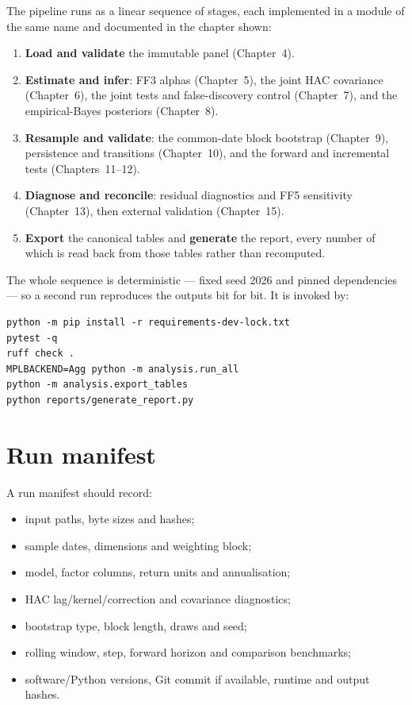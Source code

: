 The pipeline runs as a linear sequence of stages, each implemented in a
module of the same name and documented in the chapter shown:
\begin{enumerate}
\tightlist
\item
  \textbf{Load and validate} the immutable panel (Chapter~4).
\item
  \textbf{Estimate and infer}: FF3 alphas (Chapter~5), the joint HAC
  covariance (Chapter~6), the joint tests and false-discovery control
  (Chapter~7), and the empirical-Bayes posteriors (Chapter~8).
\item
  \textbf{Resample and validate}: the common-date block bootstrap
  (Chapter~9), persistence and transitions (Chapter~10), and the forward
  and incremental tests (Chapters~11--12).
\item
  \textbf{Diagnose and reconcile}: residual diagnostics and FF5 sensitivity
  (Chapter~13), then external validation (Chapter~15).
\item
  \textbf{Export} the canonical tables and \textbf{generate} the report,
  every number of which is read back from those tables rather than
  recomputed.
\end{enumerate}
The whole sequence is deterministic --- fixed seed 2026 and pinned
dependencies --- so a second run reproduces the outputs bit for bit. It is
invoked by:
\begin{verbatim}
python -m pip install -r requirements-dev-lock.txt
pytest -q
ruff check .
MPLBACKEND=Agg python -m analysis.run_all
python -m analysis.export_tables
python reports/generate_report.py
\end{verbatim}

\hypertarget{run-manifest}{%
\section{Run manifest}\label{run-manifest}}

A run manifest should record:

\begin{itemize}
\tightlist
\item
  input paths, byte sizes and hashes;
\item
  sample dates, dimensions and weighting block;
\item
  model, factor columns, return units and annualisation;
\item
  HAC lag/kernel/correction and covariance diagnostics;
\item
  bootstrap type, block length, draws and seed;
\item
  rolling window, step, forward horizon and comparison benchmarks;
\item
  software/Python versions, Git commit if available, runtime and output
  hashes.
\end{itemize}

